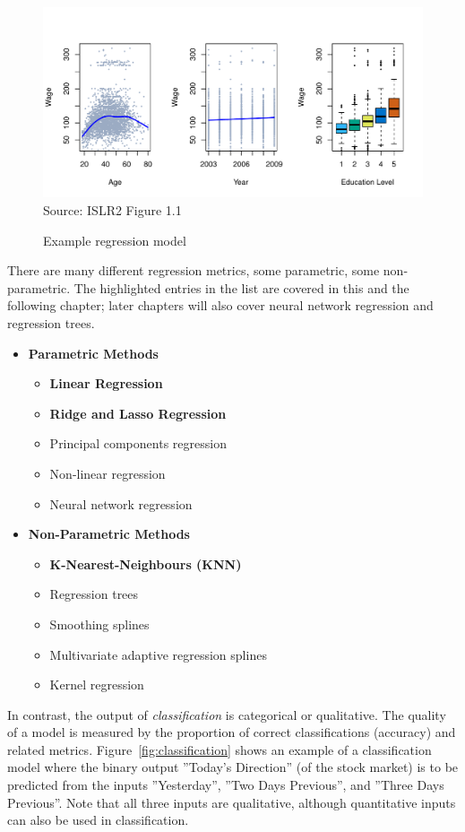 \begin{figure}
\centering
\includegraphics[width=.85\textwidth]{Figures_Chapters_1-6/Chapter1/1_1.pdf} \\
\scriptsize Source: ISLR2 Figure 1.1
\caption{Example regression model}
\label{fig:regression_chap11}
\end{figure}

There are many different regression metrics, some parametric, some non-parametric. The highlighted entries in the list are covered in this and the following chapter; later chapters will also cover neural network regression and regression trees. 

\begin{itemize}
\item \textbf{Parametric Methods}
\begin{itemize}
   \item \textbf{Linear Regression}
   \item \textbf{Ridge and Lasso Regression}
   \item Principal components regression
   \item Non-linear regression
   \item Neural network regression
\end{itemize}
\item \textbf{Non-Parametric Methods}
\begin{itemize}
  \item \textbf{K-Nearest-Neighbours (KNN)}
  \item Regression trees
  \item Smoothing splines
  \item Multivariate adaptive regression splines
  \item Kernel regression
\end{itemize}
\end{itemize}

In contrast, the output of \emph{classification} is categorical or qualitative. The quality of a model is measured by the proportion of correct classifications (accuracy) and related metrics. Figure~\ref{fig:classification} shows an example of a classification model where the binary output ''Today's Direction'' (of the stock market) is to be predicted from the inputs ''Yesterday'', ''Two Days Previous'', and ''Three Days Previous''. Note that all three inputs are qualitative, although quantitative inputs can also be used in classification.

